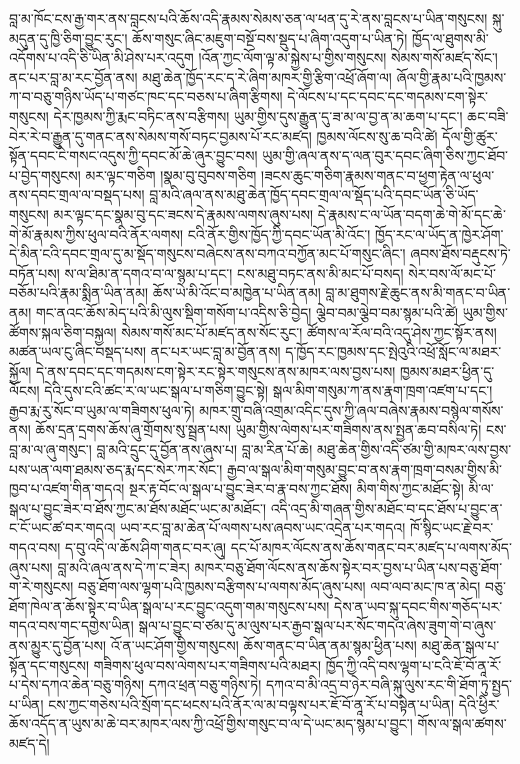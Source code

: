 \documentclass{article}
\begin{document}
བླ་མ་ཁོང་ངས་རྒྱ་གར་ནས་བླངས་པའི་ཆོས་འདི་རྣམས་སེམས་ཅན་ལ་ཕན་དུ་རེ་ནས་བླངས་པ་ཡིན་གསུངས། སྐུ་མདུན་དུ་ཁྱི་ཅིག་བྱུང་རུང་། ཆོས་གསུང་ཞིང་མཇུག་བསྔོ་བས་སྡུད་པ་ཞིག་འདུག་པ་ཡིན་ཏེ། ཁྱོད་ལ་ཐུགས་མི་འདོགས་པ་འདི་ཅི་ཡིན་མི་ཤེས་པར་འདུག །འོན་ཀྱང་ལོག་ལྟ་མ་སྐྱེས་པ་གྱིས་གསུངས། སེམས་གསོ་མཛད་སོང་། ནང་པར་བླ་མ་རང་བྱོན་ནས། མཐུ་ཆེན་ཁྱོད་རང་ད་རེ་ཞིག་མཁར་གྱི་རྩིག་འཕྲོ་ཞོག་ལ། ཞོལ་གྱི་རྣམ་པའི་ཁྱམས་ཀ་བ་བཅུ་གཉིས་ཡོད་པ་གཙང་ཁང་དང་བཅས་པ་ཞིག་རྩིགས། དེ་ལོངས་པ་དང་དབང་དང་གདམས་ངག་སྟེར་གསུངས། དེར་ཁྱམས་ཀྱི་རྨང་བཏིང་ནས་བརྩིགས། ཡུམ་གྱིས་དུས་རྒྱུན་དུ་ཟ་མ་ལ་བྱ་ན་མ་ཆག་པ་དང་། ཆང་བཟི་བེར་རེ་བ་རྒྱུན་དུ་གནང་ནས་སེམས་གསོ་བཏང་བྱམས་པོ་རང་མཛད། ཁྱམས་ལོངས་སུ་ཆ་བའི་ཚེ། དོལ་གྱི་ཚུར་སྟོན་དབང་ངེ་གསང་འདུས་ཀྱི་དབང་མོ་ཆེ་ཞུར་བྱུང་བས། ཡུམ་གྱི་ཞལ་ནས་ད་ལན་བུར་དབང་ཞིག་ཅིས་ཀྱང་ཐོབ་པ་བྱེད་གསུངས། མར་ལྟང་གཅིག །སྣམ་བུ་བུབས་གཅིག །ཟངས་ཆུང་གཅིག་རྣམས་གནང་བ་ཕྱག་རྟེན་ལ་ཕུལ་ནས་དབང་གྲལ་ལ་བསྡད་པས། བླ་མའི་ཞལ་ནས་མཐུ་ཆེན་ཁྱོད་དབང་གྲལ་ལ་སྡོད་པའི་དབང་ཡོན་ཅི་ཡོད་གསུངས། མར་ལྟང་དང་སྣམ་བུ་དང་ཟངས་དེ་རྣམས་ལགས་ཞུས་པས། དེ་རྣམས་ང་ལ་ཡོན་བདག་ཆེ་གེ་མོ་དང་ཆེ་གེ་མོ་རྣམས་ཀྱིས་ཕུལ་བའི་ནོར་ལགས། ངའི་ནོར་གྱིས་ཁྱོད་ཀྱི་དབང་ཡོན་མི་འོང་། ཁྱོད་རང་ལ་ཡོད་ན་ཁྱེར་ཤོག་དེ་མིན་ངའི་དབང་གྲལ་དུ་མ་སྡོད་གསུངས་བཞེངས་ནས་བཀའ་བཀྱོན་མང་པོ་གསུང་ཞིང་། ཞབས་ཐོས་བརྡུངས་ཏེ་བཏོན་པས། ས་ལ་ཐིམ་ན་དགའ་བ་ལ་སྙམ་པ་དང་། ངས་མཐུ་བཏང་ནས་མི་མང་པོ་བསད། སེར་བས་ལོ་མང་པོ་བཅོམ་པའི་རྣམ་སྨིན་ཡིན་ནམ། ཆོས་ཡེ་མི་འོང་བ་མཁྱེན་པ་ཡིན་ནམ། བླ་མ་ཐུགས་རྗེ་ཆུང་ནས་མི་གནང་བ་ཡིན་ནམ། གང་ནའང་ཆོས་མེད་པའི་མི་ལུས་སྡིག་གསོག་པ་འདིས་ཅི་བྱེད། ལྕེབ་བམ་ལྕེབ་བམ་སྙམ་པའི་ཚེ། ཡུམ་གྱིས་ཚོགས་སྐལ་ཅིག་བསྐྱལ། སེམས་གསོ་མང་པོ་མཛད་ནས་སོང་རུང་། ཚོགས་ལ་རོལ་བའི་འདུ་ཤེས་ཀྱང་སྟོར་ནས། མཚན་ཡལ་ངུ་ཞིང་བསྡད་པས། ནང་པར་ཡང་བླ་མ་བྱོན་ནས། ད་ཁྱོད་རང་ཁྱམས་དང་སྤེའུའི་འཕྲོ་སློང་ལ་མཐར་སྐྱོལ། དེ་ནས་དབང་དང་གདམས་ངག་སྟེར་རང་སྟེར་གསུངས་ནས་མཁར་ལས་བྱས་པས། ཁྱམས་མཐར་ཕྱིན་དུ་ལོངས། དེའི་དུས་ངའི་ཚང་ར་ལ་ཡང་སྒལ་པ་གཅིག་བྱུང་སྟེ། སྒལ་མིག་གསུམ་ཀ་ནས་རྣག་ཁྲག་འཛག་པ་དང་། རྒྱབ་རྨ་རུ་སོང་བ་ཡུམ་ལ་གཟིགས་ཕུལ་ཏེ། མཁར་གྲུ་བཞི་འགྲམ་འདིང་དུས་ཀྱི་ཞལ་བཞེས་རྣམས་བསྙེལ་གསོས་ནས། ཆོས་དྲན་དྲགས་ཆོས་ཞུ་གྲོགས་སུ་སྦྲན་པས། ཡུམ་གྱིས་ལེགས་པར་གཟིགས་ནས་སྤྱན་ཆབ་བསིལ་ཏེ། ངས་བླ་མ་ལ་ཞུ་གསུང་། བླ་མའི་དྲུང་དུ་བྱོན་ནས་ཞུས་པ། བླ་མ་རིན་པོ་ཆེ། མཐུ་ཆེན་གྱིས་འདི་ཙམ་གྱི་མཁར་ལས་བྱས་པས་ཡན་ལག་ཐམས་ཅད་རྨ་དང་སེར་ཀར་སོང་། རྒྱབ་ལ་སྒལ་མིག་གསུམ་བྱུང་བ་ནས་རྣག་ཁྲག་བསམ་གྱིས་མི་ཁྱབ་པ་འཛག་གིན་གདའ། སྔར་རྟ་བོང་ལ་སྒལ་པ་བྱུང་ཟེར་བ་རྣ་བས་ཀྱང་ཐོས། མིག་གིས་ཀྱང་མཐོང་སྟེ། མི་ལ་སྒལ་པ་བྱུང་ཟེར་བ་ཐོས་ཀྱང་མ་ཐོས་མཐོང་ཡང་མ་མཐོང་། འདི་འདྲ་མི་གཞན་གྱིས་མཐོང་བ་དང་ཐོས་པ་བྱུང་ན་ང་ངོ་ཡང་ཚ་བར་གདའ། ཡབ་རང་བླ་མ་ཆེན་པོ་ལགས་པས་ཞབས་ཡང་འདྲེན་པར་གདའ། ཁོ་སྙིང་ཡང་རྗེ་བར་གདའ་བས། ད་བུ་འདི་ལ་ཆོས་ཤིག་གནང་བར་ཞུ། དང་པོ་མཁར་ལོངས་ནས་ཆོས་གནང་བར་མཛད་པ་ལགས་མོད་ཞུས་པས། བླ་མའི་ཞལ་ནས་དེ་ཀ་ང་ཟེར། མཁར་བཅུ་ཐོག་ལོངས་ནས་ཆོས་སྟེར་བར་བྱས་པ་ཡིན་པས་བཅུ་ཐོག་ག་རེ་གསུངས། བཅུ་ཐོག་ལས་ལྷག་པའི་ཁྱམས་བརྩིགས་པ་ལགས་མོད་ཞུས་པས། ལབ་ལབ་མང་ཁ་ན་མེད། བཅུ་ཐོག་ཁེལ་ན་ཆོས་སྟེར་བ་ཡིན་སྒལ་པ་རང་བྱུང་འདུག་གམ་གསུངས་པས། དེས་ན་ཡབ་སྐུ་དབང་གིས་གཅོད་པར་གདའ་བས་གང་དགྱེས་ཡིན། སྒལ་པ་བྱུང་བ་ཙམ་དུ་མ་ལུས་པར་རྒྱབ་སྒལ་པར་སོང་གདའ་ཞེས་ཟུག་གེ་བ་ཞུས་ནས་མྱུར་དུ་བྱོན་པས། འོ་ན་ཡང་ཤོག་གྱིས་གསུངས། ཆོས་གནང་བ་ཡིན་ནམ་སྙམ་ཕྱིན་པས། མཐུ་ཆེན་སྒལ་པ་སྟོན་དང་གསུངས། གཟིགས་ཕུལ་བས་ལེགས་པར་གཟིགས་པའི་མཐར། ཁྱོད་ཀྱི་འདི་བས་ལྷག་པ་ངའི་ཇོ་བོ་ནཱ་རོ་པ་དེས་དཀའ་ཆེན་བཅུ་གཉིས། དཀའ་ཕྲན་བཅུ་གཉིས་ཏེ། དཀའ་བ་མི་འདྲ་བ་ཉེར་བཞི་སྐུ་ལུས་རང་གི་ཐོག་ཏུ་སྤྱད་པ་ཡིན། ངས་ཀྱང་གཅེས་པའི་སྲོག་དང་ཕངས་པའི་ནོར་ལ་མ་བལྟས་པར་ཇོ་བོ་ནཱ་རོ་པ་བསྟེན་པ་ཡིན། དེའི་ཕྱིར་ཆོས་འདོད་ན་ཡུས་མ་ཆེ་བར་མཁར་ལས་ཀྱི་འཕྲོ་གྱིས་གསུང་བ་ལ་དེ་ཡང་མད་སྙམ་པ་བྱུང་། གོས་ལ་སྒལ་ཚགས་མཛད་དེ། 
\end{document}
